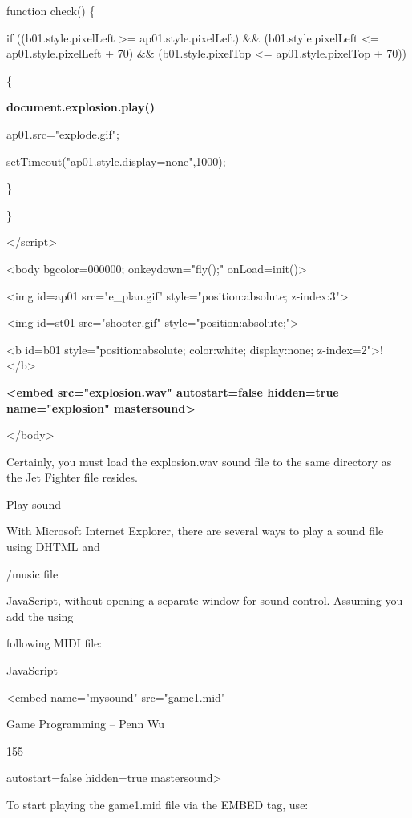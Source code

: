 \documentclass[
]{article}
\begin{document}
function check() \{

if ((b01.style.pixelLeft \textgreater= ap01.style.pixelLeft) \&\&
(b01.style.pixelLeft \textless= ap01.style.pixelLeft + 70) \&\&
(b01.style.pixelTop \textless= ap01.style.pixelTop + 70))

\{

\textbf{document.explosion.play()}

ap01.src="explode.gif";

setTimeout("ap01.style.display=\textquotesingle none\textquotesingle",1000);

\}

\}

\textless/script\textgreater{}

\textless body bgcolor=000000; onkeydown="fly();"
onLoad=init()\textgreater{}

\textless img id=ap01 src="e\_plan.gif" style="position:absolute;
z-index:3"\textgreater{}

\textless img id=st01 src="shooter.gif"
style="position:absolute;"\textgreater{}

\textless b id=b01 style="position:absolute; color:white; display:none;
z-index=2"\textgreater!\textless/b\textgreater{}

\textbf{\textless embed src="explosion.wav" autostart=false hidden=true}
\textbf{name="explosion" mastersound\textgreater{}}

\textless/body\textgreater{}

Certainly, you must load the explosion.wav sound file to the same
directory as the Jet Fighter file resides.

Play sound

With Microsoft Internet Explorer, there are several ways to play a sound
file using DHTML and

/music file

JavaScript, without opening a separate window for sound control.
Assuming you add the using

following MIDI file:

JavaScript

\textless embed name="mysound" src="game1.mid"

Game Programming -- Penn Wu

155

\protect\hypertarget{index_split_010.htmlux5cux23p156}{}{}autostart=false
hidden=true mastersound\textgreater{}

To start playing the game1.mid file via the EMBED tag, use:
\end{document}
